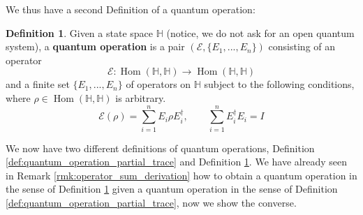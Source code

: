 \documentclass[12pt]{article}
\theoremstyle{plain}
\theoremstyle{definition}
\newtheorem{defn}[thm]{Definition} %
\newcommand{\bb}[1]{\mathbb{#1}}
\newcommand{\call}[1]{\mathcal{#1}}
\newcommand{\lto}{\longrightarrow}
\begin{document}
	We thus have a second Definition of a quantum operation:
	\begin{defn}\label{def:operator_sum}
		Given a state space $\bb{H}$ (notice, we do not ask for an open quantum system), a \textbf{quantum operation} is a pair $(\call{E}, \lbrace E_1,...,E_n \rbrace)$ consisting of an operator
		\begin{equation}
			\call{E}: \operatorname{Hom}(\bb{H},\bb{H}) \lto \operatorname{Hom}(\bb{H}, \bb{H})
			\end{equation}
		and a finite set $\lbrace E_1,...,E_n\rbrace$ of operators on $\bb{H}$ subject to the following conditions, where $\rho \in \operatorname{Hom}(\bb{H}, \bb{H})$ is arbitrary.
		\begin{equation}
			\call{E}(\rho) = \sum_{i = 1}^n E_i \rho E_i^\dagger,\qquad \sum_{i = 1}^n E_i^\dagger E_i = I
			\end{equation}
	\end{defn}
	We now have two different definitions of quantum operations, Definition \ref{def:quantum_operation_partial_trace} and Definition \ref{def:operator_sum}. We have already seen in Remark \ref{rmk:operator_sum_derivation} how to obtain a quantum operation in the sense of Definition \ref{def:operator_sum} given a quantum operation in the sense of Definition \ref{def:quantum_operation_partial_trace}, now we show the converse.
\end{document}
